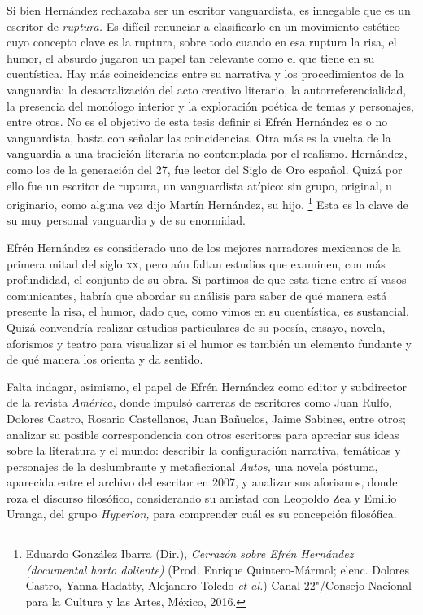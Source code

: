 \documentclass[14pt,twoside,final]{extbook} %
\let\oldfootnote\footnote
\renewcommand\footnote[1]{%
\oldfootnote{\hspace{1mm}#1}}
\begin{document}
Si bien Hernández rechazaba ser un escritor vanguardista, es innegable que es un escritor de \emph{ruptura.} Es difícil renunciar a clasificarlo en un movimiento estético cuyo concepto clave es la ruptura, sobre todo cuando en esa ruptura la risa, el humor, el absurdo jugaron un papel tan relevante como el que tiene en su cuentística. Hay más coincidencias entre su narrativa y los procedimientos de la vanguardia: la desacralización del acto creativo literario, la autorreferencialidad, la presencia del monólogo interior y la exploración poética de temas y personajes, entre otros. No es el objetivo de esta tesis definir si Efrén Hernández es o no vanguardista, basta con señalar las coincidencias. Otra más es la vuelta de la vanguardia a una tradición literaria no contemplada por el realismo. Hernández, como los de la generación del 27, fue lector del Siglo de Oro español. Quizá por ello fue un escritor de ruptura, un vanguardista atípico: sin grupo, original, u originario, como alguna vez dijo Martín Hernández, su hijo.\footnote{Eduardo González Ibarra (Dir.), \emph{Cerrazón sobre Efrén Hernández (documental harto doliente)} (Prod. Enrique Quintero-Mármol; elenc. Dolores Castro, Yanna Hadatty, Alejandro Toledo \emph{et al.}) Canal 22"/Consejo Nacional para la Cultura y las Artes, México, 2016.} Esta es la clave de su muy personal vanguardia y de su enormidad.
\def\dinkus{\bfseries\textasteriskcentered\space\textasteriskcentered\space\textasteriskcentered}
\begin{center}
\dinkus
\end{center}
Efrén Hernández es considerado uno de los mejores narradores mexicanos de la primera mitad del siglo \textsc{xx}, pero aún faltan estudios que examinen, con más profundidad, el conjunto de su obra. Si partimos de que esta tiene entre sí vasos comunicantes, habría que abordar su análisis para saber de qué manera está presente la risa, el humor, dado que, como vimos en su cuentística, es sustancial. Quizá convendría realizar estudios particulares de su poesía, ensayo, novela, aforismos y teatro para visualizar si el humor es también un elemento fundante y de qué manera los orienta y da sentido.

Falta indagar, asimismo, el papel de Efrén Hernández como editor y subdirector de la revista \emph{América,} donde impulsó carreras de escritores como Juan Rulfo, Dolores Castro, Rosario Castellanos, Juan Bañuelos, Jaime Sabines, entre otros; analizar su posible correspondencia con otros escritores para apreciar sus ideas sobre la literatura y el mundo: describir la configuración narrativa, temáticas y personajes de la deslumbrante y metaficcional \emph{Autos,} una novela póstuma, aparecida entre el archivo del escritor en 2007, y analizar sus aforismos, donde roza el discurso filosófico, considerando su amistad con Leopoldo Zea y Emilio Uranga, del grupo \emph{Hyperion,} para comprender cuál es su concepción filosófica.
\end{document}
